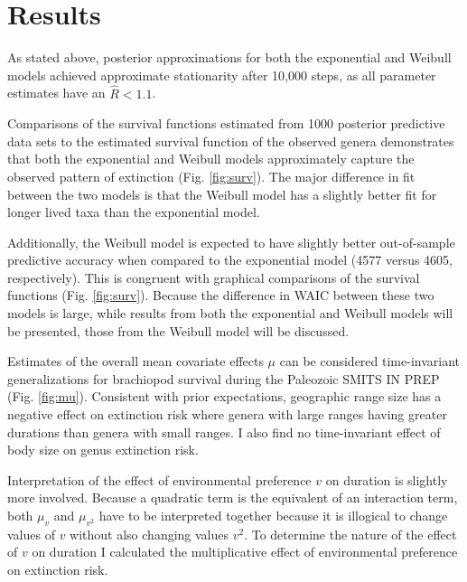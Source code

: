 \documentclass[12pt,letterpaper]{article}
\begin{document}
\section{Results}

As stated above, posterior approximations for both the exponential and Weibull models achieved approximate stationarity after 10,000 steps, as all parameter estimates have an \(\hat{R} < 1.1\).%

Comparisons of the survival functions estimated from 1000 posterior predictive data sets to the estimated survival function of the observed genera demonstrates that both the exponential and Weibull models approximately capture the observed pattern of extinction (Fig. \ref{fig:surv}). The major difference in fit between the two models is that the Weibull model has a slightly better fit for longer lived taxa than the exponential model.


Additionally, the Weibull model is expected to have slightly better out-of-sample predictive accuracy when compared to the exponential model (4577 versus 4605, respectively). This is congruent with graphical comparisons of the survival functions (Fig. \ref{fig:surv}). Because the difference in WAIC between these two models is large, while results from both the exponential and Weibull models will be presented, those from the Weibull model will be discussed.

Estimates of the overall mean covariate effects \(\mu\) can be considered time-invariant generalizations for brachiopod survival during the Paleozoic \uppercase{Smits in prep} (Fig. \ref{fig:mu}). Consistent with prior expectations, geographic range size has a negative effect on extinction risk where genera with large ranges having greater durations than genera with small ranges. I also find no time-invariant effect of body size on genus extinction risk. 

Interpretation of the effect of environmental preference \(v\) on duration is slightly more involved. Because a quadratic term is the equivalent of an interaction term, both \(\mu_{v}\) and \(\mu_{v^{2}}\) have to be interpreted together because it is illogical to change values of \(v\) without also changing values \(v^{2}\). To determine the nature of the effect of \(v\) on duration I calculated the multiplicative effect of environmental preference on extinction risk.
\end{document}
